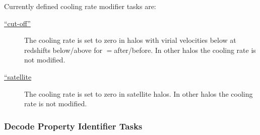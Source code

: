 Currently defined cooling rate modifier tasks are:
\begin{description}
\item [\hyperlink{cooling.cooling_rate.modifier.cut_off.F90:cooling_rates_modifier_cut_off:cooling_rate_modifier_cut_off}{``cut-off''}] The cooling rate is set to zero in halos with virial velocities below {\normalfont \ttfamily [coolingCutOffVelocity]} at redshifts below/above {\normalfont \ttfamily [coolingCutOffRedshift]} for {\normalfont \ttfamily [coolingCutOffWhen]}$=${\normalfont \ttfamily after/before}. In other halos the cooling rate is not modified.
\item [\hyperlink{cooling.cooling_rate.modifier.no_cooling_satellites.F90:cooling_rates_modifier_satellite:cooling_rate_modifier_satellite}{``satellite}] The cooling rate is set to zero in satellite halos. In other halos the cooling rate is not modified.
\end{description}

\subsubsection{Decode Property Identifier Tasks}\label{sec:DecodePropertyIndentifierTask}

